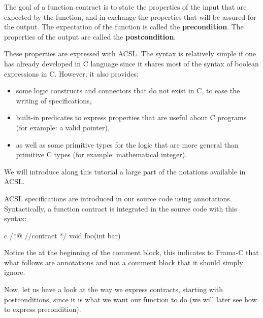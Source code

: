 The goal of a function contract is to state the properties of the input that are
expected by the function, and in exchange the properties that will be assured
for the output. The expectation of the function is called the
\textbf{precondition}. The properties of the output are called the
\textbf{postcondition}.



These properties are expressed with ACSL. The syntax is relatively
simple if one has already developed in C language since it shares most
of the syntax of boolean expressions in C. However, it also provides:



\begin{itemize}
\item
  some logic constructs and connectors that do not exist in C, to ease
  the writing of specifications,
\item
  built-in predicates to express properties that are useful about C
  programs (for example: a valid pointer),
\item
  as well as some primitive types for the logic that are more general
  than primitive C types (for example: mathematical integer).
\end{itemize}



We will introduce along this tutorial a large part of the notations
available in ACSL.



ACSL specifications are introduced in our source code using annotations.
Syntactically, a function contract is integrated in the source code with
this syntax:



\begin{CodeBlock}{c}
/*@
  //contract
*/
void foo(int bar){

}
\end{CodeBlock}



Notice the  at the beginning of the comment block, this
indicates to Frama-C that what follows are annotations and not a comment
block that it should simply ignore.



Now, let us have a look at the way we express contracts, starting with
postconditions, since it is what we want our function to do (we will
later see how to express precondition).





